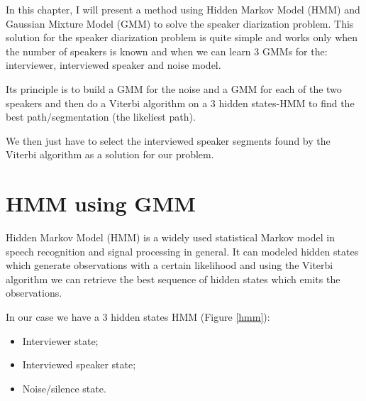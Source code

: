 \documentclass{techrep} %
\begin{document}
In this chapter, I will present a method using Hidden Markov Model
(HMM) and Gaussian Mixture Model (GMM) to solve the speaker
diarization problem. This solution for the speaker diarization problem
is quite simple and works only when the number of speakers is known
and when we can learn 3 GMMs for the: interviewer, interviewed speaker
and noise model.


Its principle is to build a GMM for the noise and a GMM for each of
the two speakers and then do a Viterbi algorithm on a 3 hidden
states-HMM to find the best path/segmentation (the likeliest path).


We then just have to select the interviewed speaker segments found by
the Viterbi algorithm as a solution for our problem.


\section{HMM using GMM}

Hidden Markov Model (HMM) is a widely used statistical Markov model in
speech recognition and signal processing in general. It can modeled
hidden states which generate observations with a certain likelihood
and using the Viterbi algorithm we can retrieve the best sequence of
hidden states which emits the observations.


In our case we have a 3 hidden states HMM (Figure \ref{hmm}):
\begin{itemize}
\item Interviewer state;
\item Interviewed speaker state;
\item Noise/silence state.
\end{itemize}
\end{document}
